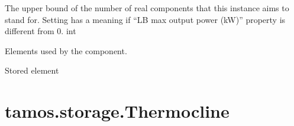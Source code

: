 \documentclass[letterpaper,10pt,english]{sphinxmanual}
\begin{document}
\begin{fulllineitems}
\begin{fulllineitems}
\end{fulllineitems}


\begin{fulllineitems}
\label{\detokenize{generated/tamos.storage.OneVector:tamos.storage.OneVector.units_number_ub}}
\pysigstartsignatures
{}
\pysigstopsignatures
\sphinxAtStartPar
The upper bound of the number of real components that this instance aims to stand for.
Setting  has a meaning if “LB max output power (kW)” property is different from 0.
int

\end{fulllineitems}


\begin{fulllineitems}
\label{\detokenize{generated/tamos.storage.OneVector:tamos.storage.OneVector.used_elements}}
\pysigstartsignatures
{}
\pysigstopsignatures
\sphinxAtStartPar
Elements used by the component.

\end{fulllineitems}


\begin{fulllineitems}
\label{\detokenize{generated/tamos.storage.OneVector:tamos.storage.OneVector.vector}}
\pysigstartsignatures
{}
\pysigstopsignatures
\sphinxAtStartPar
Stored element

\end{fulllineitems}


\end{fulllineitems}


\sphinxstepscope


\section{tamos.storage.Thermocline}
\label{\detokenize{generated/tamos.storage.Thermocline:tamos-storage-thermocline}}\label{\detokenize{generated/tamos.storage.Thermocline::doc}}
\end{document}
